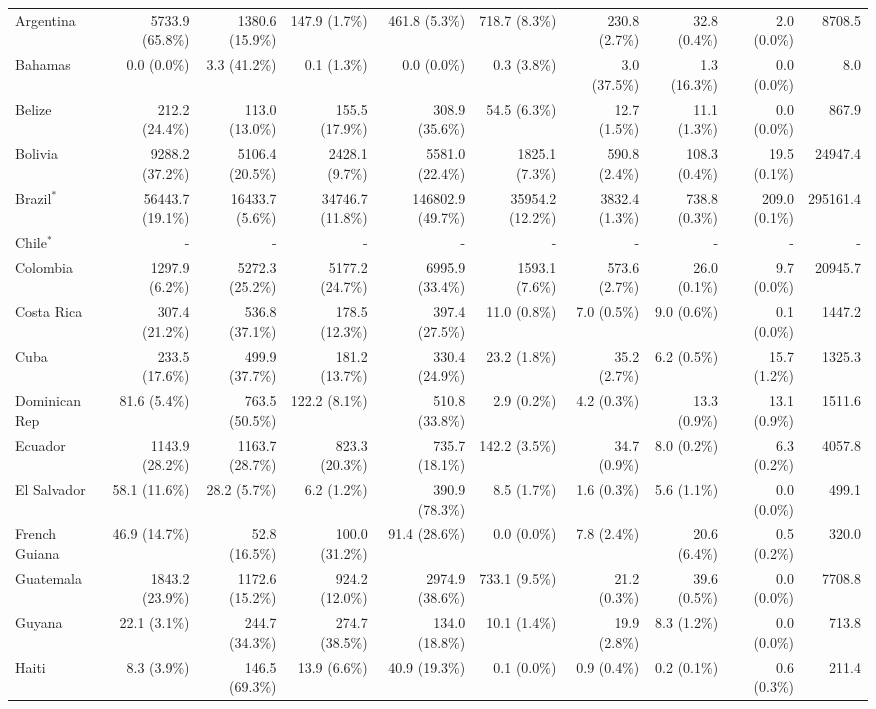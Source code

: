 \begin{scriptsize}
\begin{landscape}
\begin{center}
\begin{longtable}[ht]{lrrrrrrrrr}
			Argentina&5733.9 (65.8\%)&1380.6 (15.9\%)&147.9 (1.7\%)&461.8 (5.3\%)&718.7 (8.3\%)&230.8 (2.7\%)&32.8 (0.4\%)&2.0 (0.0\%)&8708.5\\
			Bahamas&0.0 (0.0\%)&3.3 (41.2\%)&0.1 (1.3\%)&0.0 (0.0\%)&0.3 (3.8\%)&3.0 (37.5\%)&1.3 (16.3\%)&0.0 (0.0\%)&8.0\\
			Belize&212.2 (24.4\%)&113.0 (13.0\%)&155.5 (17.9\%)&308.9 (35.6\%)&54.5 (6.3\%)&12.7 (1.5\%)&11.1 (1.3\%)&0.0 (0.0\%)&867.9\\
			Bolivia&9288.2 (37.2\%)&5106.4 (20.5\%)&2428.1 (9.7\%)&5581.0 (22.4\%)&1825.1 (7.3\%)&590.8 (2.4\%)&108.3 (0.4\%)&19.5 (0.1\%)&24947.4\\
			Brazil$^*$&56443.7 (19.1\%)&16433.7 (5.6\%)&34746.7 (11.8\%)&146802.9 (49.7\%)&35954.2 (12.2\%)&3832.4 (1.3\%)&738.8 (0.3\%)&209.0 (0.1\%)&295161.4\\
			Chile$^*$&-&-&-&-&-&-&-&-&-\\
			Colombia&1297.9 (6.2\%)&5272.3 (25.2\%)&5177.2 (24.7\%)&6995.9 (33.4\%)&1593.1 (7.6\%)&573.6 (2.7\%)&26.0 (0.1\%)&9.7 (0.0\%)&20945.7\\
			Costa Rica&307.4 (21.2\%)&536.8 (37.1\%)&178.5 (12.3\%)&397.4 (27.5\%)&11.0 (0.8\%)&7.0 (0.5\%)&9.0 (0.6\%)&0.1 (0.0\%)&1447.2\\
			Cuba&233.5 (17.6\%)&499.9 (37.7\%)&181.2 (13.7\%)&330.4 (24.9\%)&23.2 (1.8\%)&35.2 (2.7\%)&6.2 (0.5\%)&15.7 (1.2\%)&1325.3\\
			Dominican Rep&81.6 (5.4\%)&763.5 (50.5\%)&122.2 (8.1\%)&510.8 (33.8\%)&2.9 (0.2\%)&4.2 (0.3\%)&13.3 (0.9\%)&13.1 (0.9\%)&1511.6\\
			Ecuador&1143.9 (28.2\%)&1163.7 (28.7\%)&823.3 (20.3\%)&735.7 (18.1\%)&142.2 (3.5\%)&34.7 (0.9\%)&8.0 (0.2\%)&6.3 (0.2\%)&4057.8\\
			El Salvador&58.1 (11.6\%)&28.2 (5.7\%)&6.2 (1.2\%)&390.9 (78.3\%)&8.5 (1.7\%)&1.6 (0.3\%)&5.6 (1.1\%)&0.0 (0.0\%)&499.1\\
			French Guiana&46.9 (14.7\%)&52.8 (16.5\%)&100.0 (31.2\%)&91.4 (28.6\%)&0.0 (0.0\%)&7.8 (2.4\%)&20.6 (6.4\%)&0.5 (0.2\%)&320.0\\
			Guatemala&1843.2 (23.9\%)&1172.6 (15.2\%)&924.2 (12.0\%)&2974.9 (38.6\%)&733.1 (9.5\%)&21.2 (0.3\%)&39.6 (0.5\%)&0.0 (0.0\%)&7708.8\\
			Guyana&22.1 (3.1\%)&244.7 (34.3\%)&274.7 (38.5\%)&134.0 (18.8\%)&10.1 (1.4\%)&19.9 (2.8\%)&8.3 (1.2\%)&0.0 (0.0\%)&713.8\\
			Haiti&8.3 (3.9\%)&146.5 (69.3\%)&13.9 (6.6\%)&40.9 (19.3\%)&0.1 (0.0\%)&0.9 (0.4\%)&0.2 (0.1\%)&0.6 (0.3\%)&211.4\\

\end{longtable}
\end{center}
\end{landscape}
\end{scriptsize}
